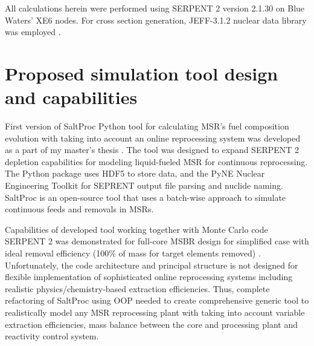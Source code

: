 All calculations herein were performed using SERPENT 2 version 2.1.30 on Blue Waters’ XE6 nodes. For cross section generation, JEFF-3.1.2 nuclear data library was employed \cite{oecd/nea_data_bank_jeff-3.1.2_2014}. 

\section{Proposed simulation tool design and capabilities}
First version of SaltProc Python tool for calculating \gls{MSR}'s fuel 
composition evolution with taking into account an online reprocessing system 
was developed as a part of my master's thesis \cite{rykhlevskii_advanced_2018, rykhlevskii_arfc/saltproc_2018}. The tool was designed to 
expand SERPENT 2 depletion capabilities for modeling liquid-fueled \gls{MSR} 
for continuous reprocessing. The Python package uses HDF5 
\cite{the_hdf_group_hierarchical_1997} to store 
data, and the PyNE Nuclear Engineering Toolkit \cite{scopatz_pyne_2012}
for SEPRENT output file parsing and nuclide naming. SaltProc is an open-source tool 
that uses a batch-wise approach to simulate continuous feeds and removals in 
\glspl{MSR}. 

Capabilities of developed tool 
working together with Monte Carlo code SERPENT 2 was demonstrated for full-core 
\gls{MSBR} design for simplified case with ideal removal efficiency (100\% of 
mass for target elements removed) \cite{rykhlevskii_modeling_2019}. Unfortunately, 
the code architecture and principal structure is not designed for flexible 
implementation of sophisticated online reprocessing systems including realistic 
physics/chemistry-based extraction efficiencies. Thus, complete refactoring of 
SaltProc using \gls{OOP} needed to create comprehensive 
generic tool to realistically model any \gls{MSR} reprocessing plant with 
taking into account variable extraction efficiencies, mass balance between 
the core and processing plant and reactivity control system.

